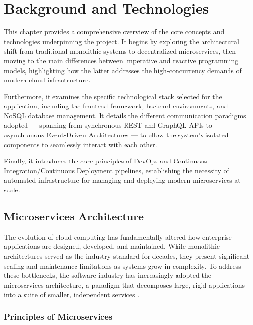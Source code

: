 \chapter{Background and Technologies}
\label{sec:background}

This chapter provides a comprehensive overview of the core concepts and technologies underpinning the project. It begins by exploring the architectural shift from traditional monolithic systems to decentralized microservices, then moving to the main differences between imperative and reactive programming models, highlighting how the latter addresses the high-concurrency demands of modern cloud infrastructure.

Furthermore, it examines the specific technological stack selected for the application, including the frontend framework, backend environments, and NoSQL database management. It details the different communication paradigms adopted — spanning from synchronous REST and GraphQL APIs to asynchronous Event-Driven Architectures — to allow the system's isolated components to seamlessly interact with each other.

Finally, it introduces the core principles of DevOps and Continuous Integration/Continuous Deployment pipelines, establishing the necessity of automated infrastructure for managing and deploying modern microservices at scale.


\section{Microservices Architecture}
\label{sec:microservices}

The evolution of cloud computing has fundamentally altered how enterprise applications are designed, developed, and maintained. While monolithic architectures served as the industry standard for decades, they present significant scaling and maintenance limitations as systems grow in complexity. To address these bottlenecks, the software industry has increasingly adopted the microservices architecture, a paradigm that decomposes large, rigid applications into a suite of smaller, independent services \cite{aws_microservices}.

\subsection{Principles of Microservices}

